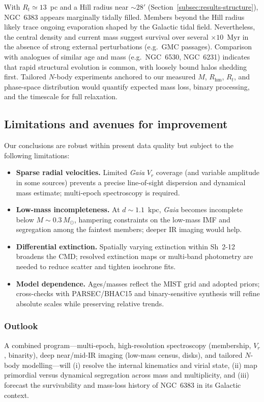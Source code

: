 \documentclass[../main.tex]{subfiles}
\begin{document}
With $R_t\simeq13$~pc and a Hill radius near $\sim28'$ (Section~\ref{subsec:results-structure}), NGC~6383 appears marginally tidally filled. Members beyond the Hill radius likely trace ongoing evaporation shaped by the Galactic tidal field. Nevertheless, the central density and current mass suggest survival over several $\times10$~Myr in the absence of strong external perturbations (e.g.\ GMC passages). Comparison with analogues of similar age and mass (e.g.\ NGC~6530, NGC~6231) indicates that rapid structural evolution is common, with loosely bound halos shedding first. Tailored $N$-body experiments anchored to our measured $M$, $R_{\text{hm}}$, $R_t$, and phase-space distribution would quantify expected mass loss, binary processing, and the timescale for full relaxation.

\subsection{Limitations and avenues for improvement}
\label{subsec:discussion-limitations}

Our conclusions are robust within present data quality but subject to the following limitations:

\begin{itemize}
  \item \textbf{Sparse radial velocities.} Limited \textit{Gaia} $V_r$ coverage (and variable amplitude in some sources) prevents a precise line-of-sight dispersion and dynamical mass estimate; multi-epoch spectroscopy is required.
  \item \textbf{Low-mass incompleteness.} At $d\!\sim\!1.1$~kpc, \textit{Gaia} becomes incomplete below $M\!\sim\!0.3\,M_\odot$, hampering constraints on the low-mass IMF and segregation among the faintest members; deeper IR imaging would help.
  \item \textbf{Differential extinction.} Spatially varying extinction within Sh~2-12 broadens the CMD; resolved extinction maps or multi-band photometry are needed to reduce scatter and tighten isochrone fits.
  \item \textbf{Model dependence.} Ages/masses reflect the MIST grid and adopted priors; cross-checks with PARSEC/BHAC15 and binary-sensitive synthesis will refine absolute scales while preserving relative trends.
\end{itemize}

\subsubsection{Outlook}
A combined program—multi-epoch, high-resolution spectroscopy (membership, $V_r$, binarity), deep near/mid-IR imaging (low-mass census, disks), and tailored $N$-body modelling—will (i) resolve the internal kinematics and virial state, (ii) map primordial versus dynamical segregation across mass and multiplicity, and (iii) forecast the survivability and mass-loss history of NGC~6383 in its Galactic context.

\biblio
\end{document}

